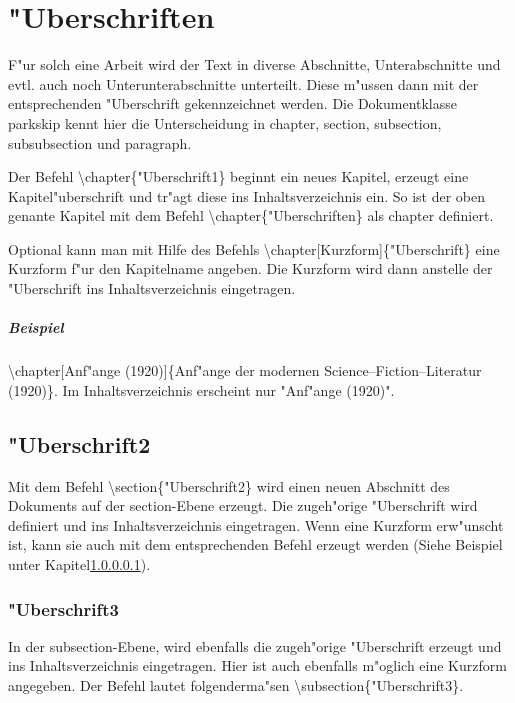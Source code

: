 \chapter{"Uberschriften}
\label{cha:uberschriften}

F"ur solch eine Arbeit wird der Text in diverse Abschnitte, Unterabschnitte und evtl. auch noch Unterunterabschnitte unterteilt. Diese m"ussen dann mit der entsprechenden "Uberschrift gekennzeichnet werden. Die Dokumentklasse parkskip kennt hier die Unterscheidung in chapter, section, subsection, subsubsection und paragraph.

Der Befehl {\textbackslash chapter\{"Uberschrift1\}} beginnt ein neues Kapitel, erzeugt eine Kapitel"uberschrift und tr"agt diese ins Inhaltsverzeichnis ein. So ist der oben genante Kapitel mit dem Befehl {\textbackslash chapter\{"Uberschriften\}} als chapter definiert.

Optional kann man mit Hilfe des Befehls {\textbackslash chapter[Kurzform]\{"Uberschrift\}} eine Kurzform f"ur den Kapitelname angeben. Die Kurzform wird dann anstelle der "Uberschrift ins Inhaltsverzeichnis eingetragen.
\paragraph{Beispiel}
\label{par:beispiel}

{\textbackslash chapter[Anf"ange (1920)]\{Anf"ange der modernen Science--Fiction--Literatur (1920)\}}. Im Inhaltsverzeichnis erscheint nur "Anf"ange (1920)".

\section{"Uberschrift2}
\label{sec:uberschrift2}

Mit dem Befehl {\textbackslash section\{"Uberschrift2\}} wird einen neuen Abschnitt des Dokuments auf der section-Ebene erzeugt. Die zugeh"orige "Uberschrift wird definiert und ins Inhaltsverzeichnis eingetragen. Wenn eine Kurzform erw"unscht ist, kann sie auch mit dem entsprechenden Befehl erzeugt werden (Siehe Beispiel unter Kapitel\ref{par:beispiel}).

\subsection{"Uberschrift3}
\label{sec:uberschrift3}

In der subsection-Ebene, wird ebenfalls die zugeh"orige "Uberschrift erzeugt und ins Inhaltsverzeichnis eingetragen. Hier ist auch ebenfalls m"oglich eine Kurzform angegeben. Der Befehl lautet folgenderma"sen {\textbackslash subsection\{"Uberschrift3\}}.

